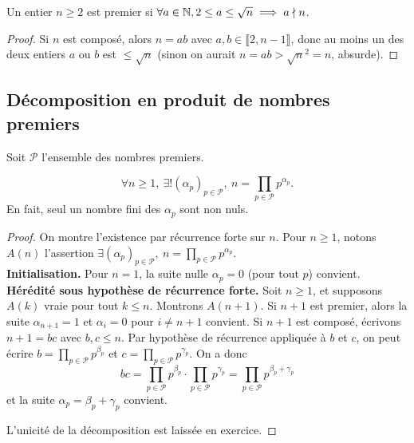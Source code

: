 \begin{proposition}
Un entier $n\geq 2$ est premier si $\forall a\in\mathbb{N},  2\leq a\leq \sqrt n \implies a\nmid n$.
\end{proposition}
\begin{proof}
Si $n$ est composé, alors $n=ab$ avec $a, b \in \llbracket 2,n-1 \rrbracket$, donc au moins un des deux entiers $a$ ou $b$ est $\leq\sqrt n$ (sinon on aurait $n=ab > \sqrt{n}^2=n$, absurde).
\end{proof}



\subsection{Décomposition en produit de nombres premiers}
Soit $\mathcal P$ l'ensemble des nombres premiers.

\begin{proposition}
\[
\forall n\geq 1, \: \exists !  (\alpha_p)_{p\in \mathcal P}, \: n = \prod_{p\in \mathcal P} p^{\alpha_p}.
\]
En fait, seul un nombre fini des $\alpha_p$ sont non nuls.
\end{proposition}
\begin{proof}
On montre l'existence par récurrence forte sur $n$. Pour $n\geq 1$, notons $A(n)$ l'assertion  $\exists  (\alpha_p)_{p\in \mathcal P}, \: n = \prod_{p\in \mathcal P} p^{\alpha_p}$.\\

\textbf{Initialisation.} Pour $n=1$, la suite nulle $\alpha_p = 0$ (pour tout $p$) convient.\\

\textbf{Hérédité sous hypothèse de récurrence forte.} Soit $n\geq 1$, et supposons $A(k)$ vraie pour tout $k\leq n$. Montrons $A(n+1)$. Si $n+1$ est premier, alors la suite $\alpha_{n+1}=1$ et $\alpha_i=0$ pour $i\neq n+1$ convient. Si $n+1$ est composé, écrivons $n+1=bc$ avec $b,c\leq n$. Par hypothèse de récurrence appliquée à $b$ et $c$, on peut écrire $b=\prod_{p\in \mathcal P} p^{\beta_p}$ et $c=\prod_{p\in \mathcal P} p^{\gamma_p}$. On a donc 
\[ bc = \prod_{p\in \mathcal P} p^{\beta_p} \cdot \prod_{p\in \mathcal P} p^{\gamma_p}
= \prod_{p\in \mathcal P} p^{\beta_p+\gamma_p}\] et la suite $\alpha_p = \beta_p+\gamma_p$ convient.

L'unicité de la décomposition est laissée en exercice.
\end{proof}

